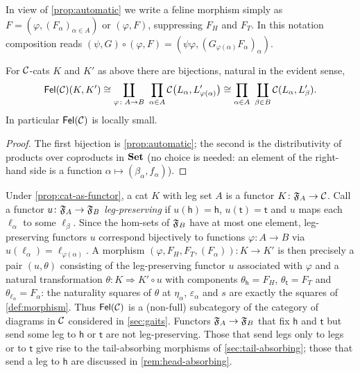 \begin{notation}\label{not:morphism}
In view of \cref{prop:automatic} we write a feline morphism simply as
$F=(\varphi,(F_\alpha)_{\alpha\in A})$ or $(\varphi,F)$, suppressing $F_H$
and $F_T$. In this notation composition reads
$(\psi,G)\circ(\varphi,F)=(\psi\varphi,(G_{\varphi(\alpha)}F_\alpha)_\alpha)$.
\end{notation}

\begin{corollary}\label{cor:Fel-hom}
For $\mathcal{C}$-cats $K$ and $K'$ as above there are bijections, natural in the
evident sense,
\[
\mathsf{Fel}(\mathcal{C})(K,K')\cong\coprod_{\varphi\colon A\to B}\ \prod_{\alpha\in A}\mathcal{C}\bigl(L_\alpha,L'_{\varphi(\alpha)}\bigr)
\cong\prod_{\alpha\in A}\ \coprod_{\beta\in B}\mathcal{C}(L_\alpha,L'_\beta).
\]
In particular $\mathsf{Fel}(\mathcal{C})$ is locally small.
\end{corollary}

\begin{proof}
The first bijection is \cref{prop:automatic}; the second is the
distributivity of products over coproducts in $\mathbf{Set}$ (no choice is needed: an
element of the right-hand side is a function $\alpha\mapsto(\beta_\alpha,f_\alpha)$).
\end{proof}

\begin{remark}\label{rem:morphism-functorial}
Under \cref{prop:cat-as-functor}, a cat $K$ with leg set $A$ is a functor
$K\colon\mathfrak{F}_A\to\mathcal{C}$. Call a functor $u\colon\mathfrak{F}_A\to\mathfrak{F}_B$
\emph{leg-preserving} if $u(\mathsf h)=\mathsf h$, $u(\mathsf t)=\mathsf t$
and $u$ maps each $\ell_\alpha$ to some $\ell_\beta$. Since the hom-sets of
$\mathfrak{F}_B$ have at most one element, leg-preserving functors $u$ correspond
bijectively to functions $\varphi\colon A\to B$ via $u(\ell_\alpha)=\ell_{\varphi(\alpha)}$.
A morphism $(\varphi,F_H,F_T,(F_\alpha))\colon K\to K'$ is then precisely a
pair $(u,\theta)$ consisting of the leg-preserving functor $u$ associated with
$\varphi$ and a natural transformation $\theta\colon K\Rightarrow K'\circ u$
with components $\theta_{\mathsf h}=F_H$, $\theta_{\mathsf t}=F_T$ and
$\theta_{\ell_\alpha}=F_\alpha$: the naturality squares of $\theta$ at
$\eta_\alpha$, $\varepsilon_\alpha$ and $s$ are exactly the squares of
\cref{def:morphism}. Thus $\mathsf{Fel}(\mathcal{C})$ is a (non-full) subcategory of the
category of diagrams in $\mathcal{C}$ considered in \cref{sec:gaits}. Functors
$\mathfrak{F}_A\to\mathfrak{F}_B$ that fix $\mathsf h$ and $\mathsf t$ but send some leg to
$\mathsf h$ or $\mathsf t$ are not leg-preserving. Those that send legs only to
legs or to $\mathsf t$ give rise to the tail-absorbing morphisms of
\cref{sec:tail-absorbing}; those that send a leg to $\mathsf h$ are discussed in
\cref{rem:head-absorbing}.
\end{remark}

